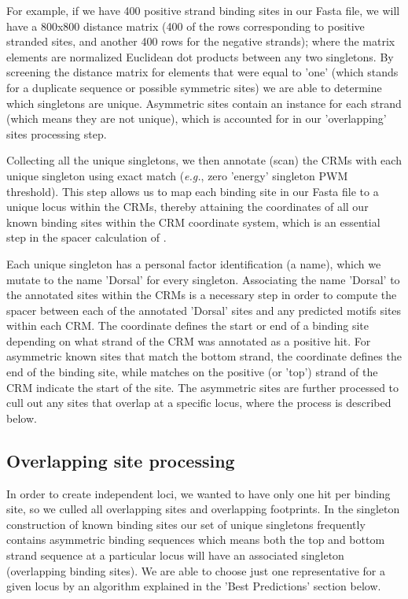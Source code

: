 For example, if we have 400 positive strand binding sites in our Fasta file, we will have a 800x800 distance matrix (400 of the rows corresponding to positive stranded sites, and another 400 rows for the negative strands); where the matrix elements are normalized Euclidean dot products between any two singletons.  By screening the distance matrix for elements that were equal to 'one' (which stands for a duplicate sequence or possible symmetric sites) we are able to determine which singletons are unique.  Asymmetric sites contain an instance for each strand (which means they are not unique), which is accounted for in our 'overlapping' sites processing step.  
	 
Collecting all the unique singletons, we then annotate (scan) the CRMs with each unique singleton using exact match (\textit{e.g.}, zero 'energy' singleton PWM threshold).  This step allows us to map each binding site in our Fasta file to a unique locus within the CRMs, thereby attaining the coordinates of all our known binding sites within the CRM coordinate system, which is an essential step in the spacer calculation of .  
	 
Each unique singleton has a personal factor identification (a name), which we mutate to the name 'Dorsal' for every singleton.  Associating the name 'Dorsal' to the annotated sites within the CRMs is a necessary step in order to compute the spacer between each of the annotated 'Dorsal' sites and any predicted motifs sites within each CRM.  The coordinate defines the start or end of a binding site depending on what strand of the CRM was annotated as a positive hit.  For asymmetric known sites that match the bottom strand, the coordinate defines the end of the binding site, while matches on the positive (or 'top') strand of the CRM indicate the start of the site.  The asymmetric sites are further processed to cull out any sites that overlap at a specific locus, where the process is described below.    

	   \subsection{Overlapping site processing}\label{overlap}
  In order to create independent loci, we wanted to have only one hit per binding site, so we culled all overlapping sites and overlapping footprints.  In the singleton construction of known binding sites our set of unique singletons frequently contains asymmetric binding sequences which means both the top and bottom strand sequence at a particular locus will have an associated singleton (overlapping binding sites).  We are able to choose just one representative for a given locus by an algorithm explained in the 'Best Predictions' section below.     
 

